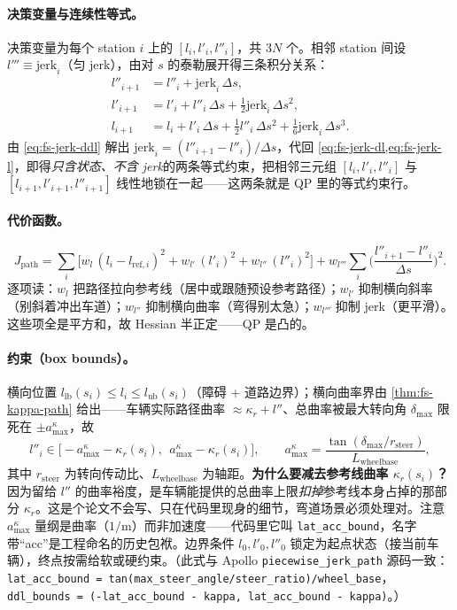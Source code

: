 \paragraph{决策变量与连续性等式。}
决策变量为每个 station $i$ 上的 $[l_i,l'_i,l''_i]$，共 $3N$ 个。相邻 station 间设 $l'''\equiv\mathrm{jerk}_i$（匀 jerk），由对 $s$ 的泰勒展开得三条积分关系：
\begin{align}
  l''_{i+1} &= l''_i+\mathrm{jerk}_i\,\Delta s, \label{eq:fs-jerk-ddl}\\
  l'_{i+1}  &= l'_i+l''_i\,\Delta s+\tfrac12\mathrm{jerk}_i\,\Delta s^2, \label{eq:fs-jerk-dl}\\
  l_{i+1}   &= l_i+l'_i\,\Delta s+\tfrac12 l''_i\,\Delta s^2+\tfrac16\mathrm{jerk}_i\,\Delta s^3. \label{eq:fs-jerk-l}
\end{align}
由 \cref{eq:fs-jerk-ddl} 解出 $\mathrm{jerk}_i=(l''_{i+1}-l''_i)/\Delta s$，代回 \cref{eq:fs-jerk-dl,eq:fs-jerk-l}，即得\emph{只含状态、不含 jerk}的两条等式约束，把相邻三元组 $[l_i,l'_i,l''_i]$ 与 $[l_{i+1},l'_{i+1},l''_{i+1}]$ 线性地锁在一起——这两条就是 QP 里的等式约束行。

\paragraph{代价函数。}
\begin{equation}
  J_{\mathrm{path}}=\sum_i\Big[w_l\,(l_i-l_{\mathrm{ref},i})^2+w_{l'}\,(l'_i)^2+w_{l''}\,(l''_i)^2\Big]
  +w_{l'''}\sum_i\Big(\frac{l''_{i+1}-l''_i}{\Delta s}\Big)^2.
  \label{eq:fs-path-cost}
\end{equation}
逐项读：$w_l$ 把路径拉向参考线（居中或跟随预设参考路径）；$w_{l'}$ 抑制横向斜率（别斜着冲出车道）；$w_{l''}$ 抑制横向曲率（弯得别太急）；$w_{l'''}$ 抑制 jerk（更平滑）。这些项全是平方和，故 Hessian 半正定——QP 是凸的。

\paragraph{约束（box bounds）。}
横向位置 $l_{\mathrm{lb}}(s_i)\le l_i\le l_{\mathrm{ub}}(s_i)$（障碍 + 道路边界）；横向曲率界由 \cref{thm:fs-kappa-path} 给出——车辆实际路径曲率 $\approx\kappa_r+l''$、总曲率被最大转向角 $\delta_{\max}$ 限死在 $\pm a^\kappa_{\max}$，故
\begin{equation}
  l''_i\in\big[-a^\kappa_{\max}-\kappa_r(s_i),\ \ a^\kappa_{\max}-\kappa_r(s_i)\big],
  \qquad a^\kappa_{\max}=\frac{\tan(\delta_{\max}/r_{\mathrm{steer}})}{L_{\mathrm{wheelbase}}},
  \label{eq:fs-ddl-bound}
\end{equation}
其中 $r_{\mathrm{steer}}$ 为转向传动比、$L_{\mathrm{wheelbase}}$ 为轴距。\textbf{为什么要减去参考线曲率 $\kappa_r(s_i)$？}因为留给 $l''$ 的曲率裕度，是车辆能提供的总曲率上限\emph{扣掉}参考线本身占掉的那部分 $\kappa_r$。这是个论文不会写、只在代码里现身的细节，弯道场景必须处理对。注意 $a^\kappa_{\max}$ 量纲是曲率（$1/\mathrm{m}$）而非加速度——代码里它叫 \texttt{lat\_acc\_bound}，名字带“acc”是工程命名的历史包袱。边界条件 $l_0,l'_0,l''_0$ 锁定为起点状态（接当前车辆），终点按需给软或硬约束。（此式与 Apollo \texttt{piecewise\_jerk\_path} 源码一致：\texttt{lat\_acc\_bound = tan(max\_steer\_angle/steer\_ratio)/wheel\_base}，\texttt{ddl\_bounds = (-lat\_acc\_bound - kappa,\ lat\_acc\_bound - kappa)}。）

